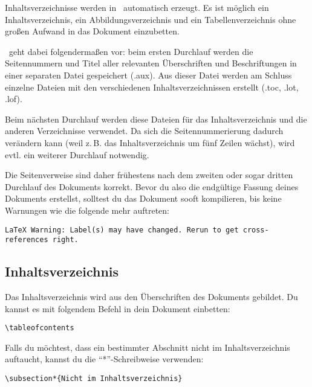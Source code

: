 Inhaltsverzeichnisse werden in \DMLLaTeX \ automatisch erzeugt. Es ist möglich ein Inhaltsverzeichnis, ein Abbildungsverzeichnis und ein Tabellenverzeichnis ohne großen Aufwand in das Dokument einzubetten.

\DMLLaTeX \ geht dabei folgendermaßen vor: beim ersten Durchlauf werden die Seitennummern und Titel aller relevanten Überschriften und Beschriftungen in einer separaten Datei gespeichert (.aux). Aus dieser Datei werden am Schluss einzelne Dateien mit den verschiedenen Inhaltsverzeichnissen erstellt (.toc, .lot, .lof).

Beim nächsten Durchlauf werden diese Dateien für das Inhaltsverzeichnis und die anderen Verzeichnisse verwendet. Da sich die Seitennummerierung dadurch verändern kann (weil z.\,B. das Inhaltsverzeichnis um fünf Zeilen wächst), wird evtl. ein weiterer Durchlauf notwendig.

Die Seitenverweise sind daher frühestens nach dem zweiten oder sogar dritten Durchlauf des Dokuments korrekt. Bevor du also die endgültige Fassung deines Dokuments erstellst, solltest du das Dokument sooft kompilieren, bis keine Warnungen wie die folgende mehr auftreten:

\begin{lstlisting}
LaTeX Warning: Label(s) may have changed. Rerun to get cross-references right.
\end{lstlisting}

\subsection{Inhaltsverzeichnis}

Das Inhaltsverzeichnis wird aus den Überschriften des Dokuments gebildet. Du kannst es mit folgendem Befehl in dein Dokument einbetten:

\begin{lstlisting}
\tableofcontents
\end{lstlisting}

\newpage
Falls du möchtest, dass ein bestimmter Abschnitt nicht im Inhaltsverzeichnis auftaucht, kannst du die \enquote{*}-Schreibweise verwenden:

\begin{lstlisting}
\subsection*{Nicht im Inhaltsverzeichnis}
\end{lstlisting}

